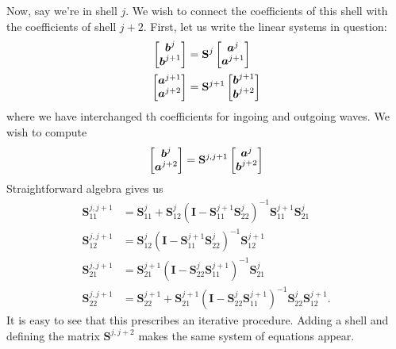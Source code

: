 Now, say we're in shell $j$. We wish to connect the coefficients of this
shell with the coefficients of shell $j+2$. First, let us write the 
linear systems in question: 
  \begin{align*}
   \begin{bmatrix} \boldsymbol{b}^j \\ \boldsymbol{b}^{j+1} \end{bmatrix}	&= \mathbf{S}^j \begin{bmatrix} \boldsymbol{a}^j \\ \boldsymbol{a}^{j+1} \end{bmatrix}	\\
   \begin{bmatrix} \boldsymbol{a}^{j+1} \\ \boldsymbol{a}^{j+2} \end{bmatrix}	&= \mathbf{S}^{j+1} \begin{bmatrix} \boldsymbol{b}^{j+1} \\ \boldsymbol{b}^{j+2} \end{bmatrix}	
  \end{align*}
where we have interchanged th coefficients for ingoing and outgoing waves. 
We wish to compute
  \begin{equation}
   \begin{bmatrix} \boldsymbol{b}^{j} \\ \boldsymbol{a}^{j+2} \end{bmatrix} = \mathbf{S}^{j,j+1} \begin{bmatrix} \boldsymbol{a}^{j} \\ \boldsymbol{b}^{j+2} \end{bmatrix}	
  \end{equation}
Straightforward algebra gives us
  \begin{subequations}
  \begin{align}
   \mathbf{S}^{j,j+1}_{11}	&= \mathbf{S}^j_{11}+\mathbf{S}^j_{12}\left(\mathbf{I}-\mathbf{S}^{j+1}_{11}\mathbf{S}^j_{22}\right)^{-1}\mathbf{S}^{j+1}_{11}\mathbf{S}^j_{21}	\\
   \mathbf{S}^{j,j+1}_{12}	&= \mathbf{S}^j_{12}\left(\mathbf{I}-\mathbf{S}^{j+1}_{11}\mathbf{S}^j_{22}\right)^{-1}\mathbf{S}^{j+1}_{12}					\\
   \mathbf{S}^{j,j+1}_{21}	&= \mathbf{S}^{j+1}_{21}\left(\mathbf{I}-\mathbf{S}^j_{22}\mathbf{S}^{j+1}_{11}\right)^{-1}\mathbf{S}^j_{21}					\\
   \mathbf{S}^{j,j+1}_{22}	&= \mathbf{S}^{j+1}_{22} + \mathbf{S}^{j+1}_{21}\left(\mathbf{I}-\mathbf{S}^j_{22}\mathbf{S}^{j+1}_{11}\right)^{-1}\mathbf{S}^j_{22}\mathbf{S}^{j+1}_{12}.
  \end{align}
  \end{subequations}
It is easy to see that this prescribes an iterative procedure. 
Adding a shell and defining the matrix $\mathbf{S}^{j,j+2}$ 
makes the same system of equations appear. 

